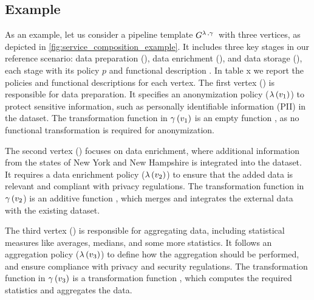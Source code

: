 \subsection{Example}\label{sec:example}
As an example, let us consider a pipeline template $G^{\lambda\,,\gamma\,}$ with three vertices, as depicted in \cref{fig:service_composition_example}.
It includes three key stages in our reference scenario: data preparation (), data enrichment (), and data storage (), each stage with its policy $p$ and functional description \F.
In table x we report the policies and functional descriptions for each vertex.
%
The first vertex () is responsible for data preparation.
It specifies an anonymization policy ($\lambda\,(v_1)$) to protect sensitive information, such as personally identifiable information (PII) in the dataset.
The transformation function  in $\gamma\,(v_1)$ is an empty function , as no functional transformation is required for anonymization.

The second vertex () focuses on data enrichment, where additional information from the states of New York and New Hampshire is integrated into the dataset.
It requires a data enrichment policy ($\lambda\,(v_2)$) to ensure that the added data is relevant and compliant with privacy regulations.
The transformation function  in $\gamma\,(v_2$) is an additive function , which merges and integrates the external data with the existing dataset.

  The third vertex () is responsible for aggregating data, including statistical measures like averages, medians, and some more statistics.
  It follows an aggregation policy ($\lambda\,(v_3)$) to define how the aggregation should be performed, and ensure compliance with privacy and security regulations.
  The transformation function  in $\gamma\,(v_3)$ is a transformation function , which computes the required statistics and aggregates the data.

